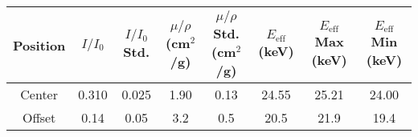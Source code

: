 \begin{tabularx}{1.15\textwidth}{cccccccc}
    \toprule
    Position & $I/I_0$ &  $I/I_0$ Std. &  $\mu/\rho$ (cm$^2$/g) &  $\mu/\rho$ Std. (cm$^2$/g) &  $E_{\text{eff}}$ (keV) &  $E_{\text{eff}}$ Max (keV) &  $E_{\text{eff}}$ Min (keV) \\
    \midrule
    Center   &  0.310   &   0.025       &   1.90                &   0.13                        &   24.55                &  25.21                       &   24.00 \\
    Offset   &  0.14    &   0.05        &   3.2                 &   0.5                         &   20.5                 &  21.9                        &   19.4  \\
    \bottomrule
\end{tabularx}               
